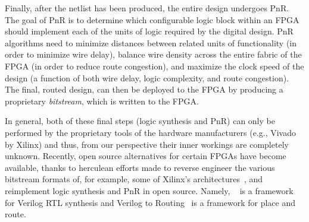 Finally, after the netlist has been produced, the entire design undergoes PnR.
The goal of PnR is to determine which configurable logic block within an FPGA should implement each of the units of logic required by the digital design.
PnR algorithms need to minimize distances between related units of functionality (in order to minimize wire delay), balance wire density across the entire fabric of the FPGA (in order to reduce route congestion), and maximize the clock speed of the design (a function of both wire delay, logic complexity, and route congestion).
The final, routed design, can then be deployed to the FPGA by producing a proprietary \emph{bitstream}, which is written to the FPGA.

In general, both of these final steps (logic synthesis and PnR) can only be performed by the proprietary tools of the hardware manufacturers (e.g., Vivado by Xilinx) and thus, from our perspective their inner workings are completely unknown.
Recently, open source alternatives for certain FPGAs have become available, thanks to herculean efforts made to reverse engineer the various bitstream formats of, for example, some of Xilinx's architectures~\cite{6546003}, and reimplement logic synthesis and PnR in open source.
Namely, ~\cite{wolf2013yosys} is a framework for Verilog RTL synthesis and Verilog to Routing~\cite{vtr} is a framework for place and route.
